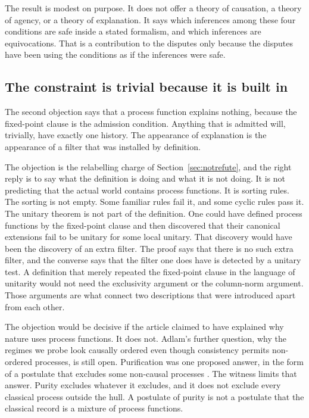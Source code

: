 \documentclass[11pt]{article}
\begin{document}
The result is modest on purpose. It does not offer a theory of causation, a theory of agency, or a theory of explanation. It says which inferences among these four conditions are safe inside a stated formalism, and which inferences are equivocations. That is a contribution to the disputes only because the disputes have been using the conditions as if the inferences were safe.

\subsection{The constraint is trivial because it is built in}
\label{sec:built}

The second objection says that a process function explains nothing, because the fixed-point clause is the admission condition. Anything that is admitted will, trivially, have exactly one history. The appearance of explanation is the appearance of a filter that was installed by definition.

The objection is the relabelling charge of Section~\ref{sec:notrefute}, and the right reply is to say what the definition is doing and what it is not doing. It is not predicting that the actual world contains process functions. It is sorting rules. The sorting is not empty. Some familiar rules fail it, and some cyclic rules pass it. The unitary theorem is not part of the definition. One could have defined process functions by the fixed-point clause and then discovered that their canonical extensions fail to be unitary for some local unitary. That discovery would have been the discovery of an extra filter. The proof says that there is no such extra filter, and the converse says that the filter one does have is detected by a unitary test. A definition that merely repeated the fixed-point clause in the language of unitarity would not need the exclusivity argument or the column-norm argument. Those arguments are what connect two descriptions that were introduced apart from each other.

The objection would be decisive if the article claimed to have explained why nature uses process functions. It does not. Adlam's further question, why the regimes we probe look causally ordered even though consistency permits non-ordered processes, is still open. Purification was one proposed answer, in the form of a postulate that excludes some non-causal processes \citep{araujo2017,adlam2023}. The witness limits that answer. Purity excludes whatever it excludes, and it does not exclude every classical process outside the hull. A postulate of purity is not a postulate that the classical record is a mixture of process functions.
\end{document}
